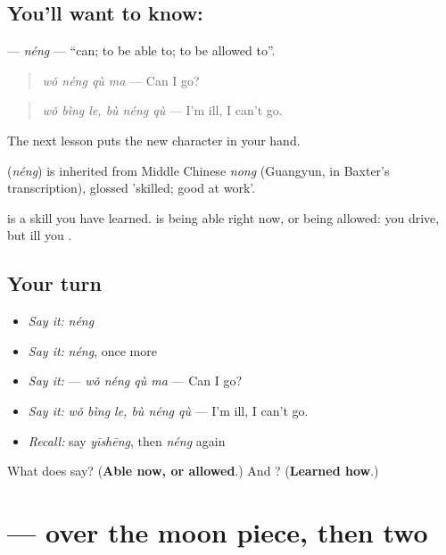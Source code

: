 \subsection*{You'll want to know: }
\textbf{} — \emph{néng} — \textquotedblleft{}can; to be able to; to be allowed to\textquotedblright{}.

\begin{quote}
\textbf{} \emph{wǒ néng qù ma} — Can I go?
\end{quote}

\begin{quote}
\emph{wǒ bìng le, bù néng qù} — I'm ill, I can't go.
\end{quote}

The next lesson puts the new character in your hand.

\begin{cousinweb}
\textbf{} (\emph{néng}) is inherited from Middle Chinese \emph{nong} (Guangyun, in Baxter's transcription), glossed 'skilled; good at work'.
\end{cousinweb}

\begin{grammarlens}[title={What you've built}]
 is a skill you have learned.  is being able right now, or being allowed: you  drive, but ill you .
\end{grammarlens}

\subsection*{Your turn}
\begin{itemize}
\raggedright
  \item \emph{Say it:} \emph{néng}
  \item \emph{Say it:} \emph{néng}, once more
  \item \emph{Say it:}  — \emph{wǒ néng qù ma} — Can I go?
  \item \emph{Say it:} \emph{wǒ bìng le, bù néng qù} — I'm ill, I can't go.
  \item \emph{Recall:} say \emph{yīshēng}, then \emph{néng} again
\end{itemize}

\begin{tcolorbox}[breakable,colback=teal!4,colframe=teal!35!black,title={Before you move on}]
What does  say? (\textbf{Able now, or allowed}.) And ? (\textbf{Learned how}.)
\end{tcolorbox}
\section[\texorpdfstring{\zh{能} (néng)}{能 (néng)}]{ —  over the moon piece, then two }

